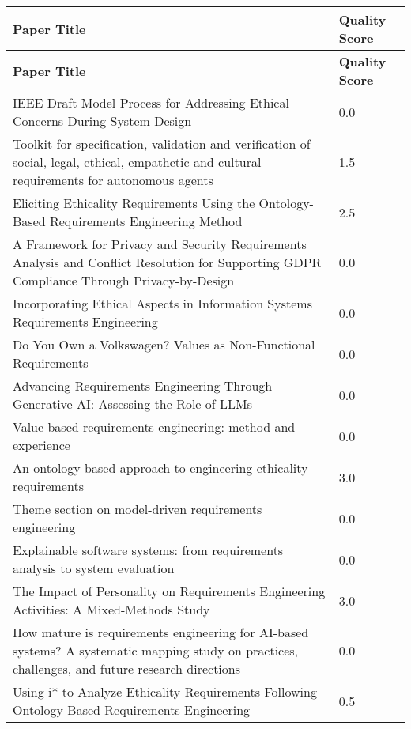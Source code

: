 \renewcommand{\arraystretch}{1.1}
\setlength{\tabcolsep}{3pt}
\begin{longtable}{| m{10cm} | m{2cm} |}
    \hline
    \textbf{Paper Title} & \textbf{Quality Score} \\
    \hline
    \endfirsthead
    \hline
    \textbf{Paper Title} & \textbf{Quality Score} \\
    \hline
    \endhead

    IEEE Draft Model Process for Addressing Ethical Concerns During System Design & 0.0 \\
    \hline
    Toolkit for specification, validation and verification of social, legal, ethical, empathetic and cultural requirements for autonomous agents & 1.5 \\
    \hline
    Eliciting Ethicality Requirements Using the Ontology-Based Requirements Engineering Method & 2.5 \\
    \hline
    A Framework for Privacy and Security Requirements Analysis and Conflict Resolution for Supporting GDPR Compliance Through Privacy-by-Design & 0.0 \\
    \hline
    Incorporating Ethical Aspects in Information Systems Requirements Engineering & 0.0 \\
    \hline
    Do You Own a Volkswagen? Values as Non-Functional Requirements & 0.0 \\
    \hline
    Advancing Requirements Engineering Through Generative AI: Assessing the Role of LLMs & 0.0 \\
    \hline
    Value-based requirements engineering: method and experience & 0.0 \\
    \hline
    An ontology-based approach to engineering ethicality requirements & 3.0 \\
    \hline
    Theme section on model-driven requirements engineering & 0.0 \\
    \hline
    Explainable software systems: from requirements analysis to system evaluation & 0.0 \\
    \hline
    The Impact of Personality on Requirements Engineering Activities: A Mixed-Methods Study & 3.0 \\
    \hline
    How mature is requirements engineering for AI-based systems? A systematic mapping study on practices, challenges, and future research directions & 0.0 \\
    \hline
    Using i* to Analyze Ethicality Requirements Following Ontology-Based Requirements Engineering & 0.5 \\
    \hline

\end{longtable}

